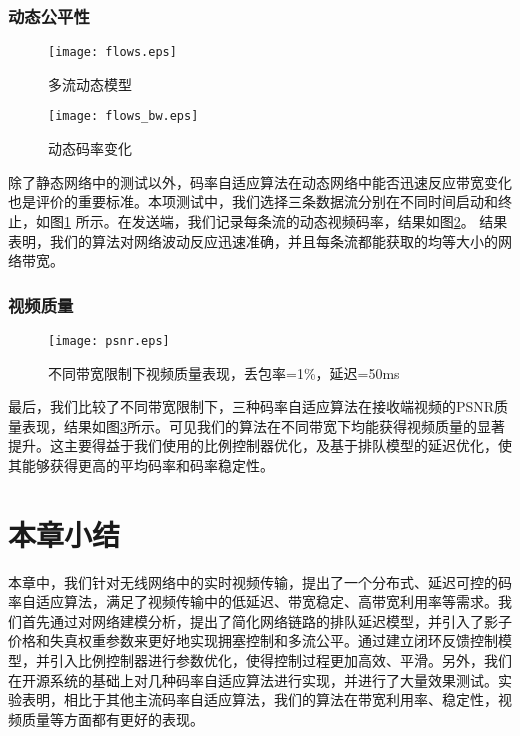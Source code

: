         \subsubsection{动态公平性}
        \begin{figure}[htbp]
          \centering
          \texttt{[image: flows.eps]}
          \caption{多流动态模型}
          \label{pic:flows}
        \end{figure}
        \begin{figure}[htbp]
          \centering
          \texttt{[image: flows\_bw.eps]}
          \caption{动态码率变化}
          \label{pic:flows_bw}
        \end{figure}

        除了静态网络中的测试以外，码率自适应算法在动态网络中能否迅速反应带宽变化也是评价的重要标准。本项测试中，我们选择三条数据流分别在不同时间启动和终止，如图\ref{pic:flows} 所示。在发送端，我们记录每条流的动态视频码率，结果如图\ref{pic:flows_bw}。 结果表明，我们的算法对网络波动反应迅速准确，并且每条流都能获取的均等大小的网络带宽。

        \subsubsection{视频质量}
        \begin{figure}[htbp]
          \centering
          \texttt{[image: psnr.eps]}
          \caption{不同带宽限制下视频质量表现，丢包率=1\%，延迟=50ms}
          \label{pic:psnr}
        \end{figure}

        最后，我们比较了不同带宽限制下，三种码率自适应算法在接收端视频的PSNR质量表现，结果如图\ref{pic:psnr}所示。可见我们的算法在不同带宽下均能获得视频质量的显著提升。这主要得益于我们使用的比例控制器优化，及基于排队模型的延迟优化，使其能够获得更高的平均码率和码率稳定性。


\section{本章小结}
本章中，我们针对无线网络中的实时视频传输，提出了一个分布式、延迟可控的码率自适应算法，满足了视频传输中的低延迟、带宽稳定、高带宽利用率等需求。我们首先通过对网络建模分析，提出了简化网络链路的排队延迟模型，并引入了影子价格和失真权重参数来更好地实现拥塞控制和多流公平。通过建立闭环反馈控制模型，并引入比例控制器进行参数优化，使得控制过程更加高效、平滑。另外，我们在开源系统的基础上对几种码率自适应算法进行实现，并进行了大量效果测试。实验表明，相比于其他主流码率自适应算法，我们的算法在带宽利用率、稳定性，视频质量等方面都有更好的表现。
